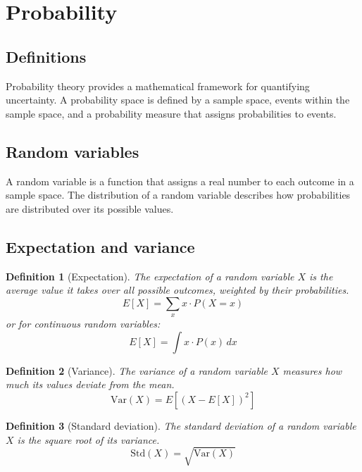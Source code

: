 \documentclass[11pt]{book} %
\newtheorem{definition}{Definition}[section]
\begin{document}
\section{Probability}

\subsection{Definitions}

Probability theory provides a mathematical framework for quantifying uncertainty. 
A probability space is defined by a sample space, events within the sample space, and a probability measure that assigns probabilities to events.

\subsection{Random variables}

A random variable is a function that assigns a real number to each outcome in a sample space. 
The distribution of a random variable describes how probabilities are distributed over its possible values.

\subsection{Expectation and variance}
\begin{definition}[Expectation]
    The expectation of a random variable \(X\) is the average value it takes over all possible outcomes, weighted by their probabilities.
    \begin{equation}
        E[X] = \sum_{x} x \cdot P(X = x)
    \end{equation}
    or for continuous random variables:
    \begin{equation}
        E[X] = \int x \cdot P(x) \, dx
    \end{equation}
\end{definition}

\begin{definition}[Variance]
    The variance of a random variable \(X\) measures how much its values deviate from the mean.
    \begin{equation}
        \text{Var}(X) = E[(X - E[X])^2]
    \end{equation}
\end{definition}

\begin{definition}[Standard deviation]
    The standard deviation of a random variable \(X\) is the square root of its variance.
    \begin{equation}
        \text{Std}(X) = \sqrt{\text{Var}(X)}
    \end{equation}
\end{definition}
\end{document}
